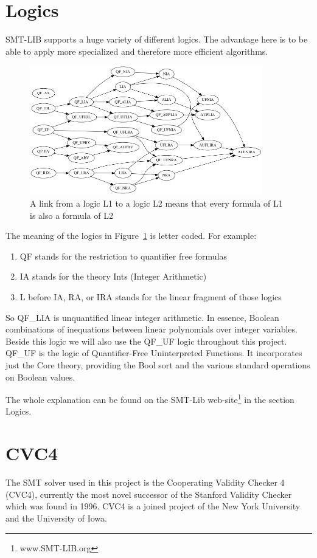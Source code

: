 \section{Logics}
SMT-LIB supports a huge variety of different logics. The advantage here is to be able to apply more specialized and therefore more efficient algorithms.
\begin{figure}
  \centering
  \includegraphics[width=0.9\textwidth]{Pictures/logics.png}  
  \caption{A link from a logic L1 to a logic L2 means that every formula of L1 is also a formula of L2}
  \label{fig:logics}
\end{figure}
The meaning of the logics in Figure~\ref{fig:logics} is letter coded. For example:
\begin{enumerate}
  \item QF stands for the restriction to quantifier free formulas
  \item IA stands for the theory Ints (Integer Arithmetic)
  \item L before IA, RA, or IRA stands for the linear fragment of those logics 
\end{enumerate}
So QF\_LIA is unquantified linear integer arithmetic. In essence, Boolean combinations of inequations between linear polynomials over integer variables. Beside this logic we will also use the QF\_UF logic throughout this project. QF\_UF is the logic of Quantifier-Free Uninterpreted Functions. It incorporates just the Core theory, providing the Bool sort and the various standard operations on Boolean values.
 
The whole explanation can be found on the SMT-Lib web-site\footnote{www.SMT-LIB.org} in the section Logics.

\section{CVC4}
The SMT solver used in this project is the Cooperating Validity Checker 4 (CVC4), currently the most novel  successor of the Stanford Validity Checker which was found in 1996. CVC4 is a joined project of the New York University and the University of Iowa.

